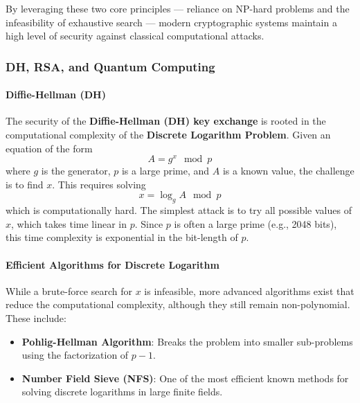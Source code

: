 By leveraging these two core principles — reliance on NP-hard problems
and the infeasibility of exhaustive search — modern cryptographic
systems maintain a high level of security against classical
computational attacks.

\subsubsection{DH, RSA, and Quantum Computing}

\paragraph{Diffie-Hellman (DH)}  
The security of the \textbf{Diffie-Hellman (DH) key exchange} is
rooted in the computational complexity of the \textbf{Discrete
Logarithm Problem}. Given an equation of the form  
\[
A = g^x \mod p
\]  
where \(g\) is the generator, \(p\) is a large prime, and \(A\) is a
known value, the challenge is to find \(x\). This requires solving  
\[
x = \log_g A \mod p
\]  
which is computationally hard. The simplest attack is to try all
possible values of \(x\), which takes time linear in \(p\). Since
\(p\) is often a large prime (e.g., 2048 bits), this time complexity
is exponential in the bit-length of \(p\).  

\paragraph{Efficient Algorithms for Discrete Logarithm}  
While a brute-force search for \(x\) is infeasible, more advanced
algorithms exist that reduce the computational complexity, although
they still remain non-polynomial. These include:  
\begin{itemize}
    \item \textbf{Pohlig-Hellman Algorithm}: Breaks the problem into
      smaller sub-problems using the factorization of \(p-1\).  
    \item \textbf{Number Field Sieve (NFS)}: One of the most efficient
      known methods for solving discrete logarithms in large finite
      fields.  
\end{itemize}


